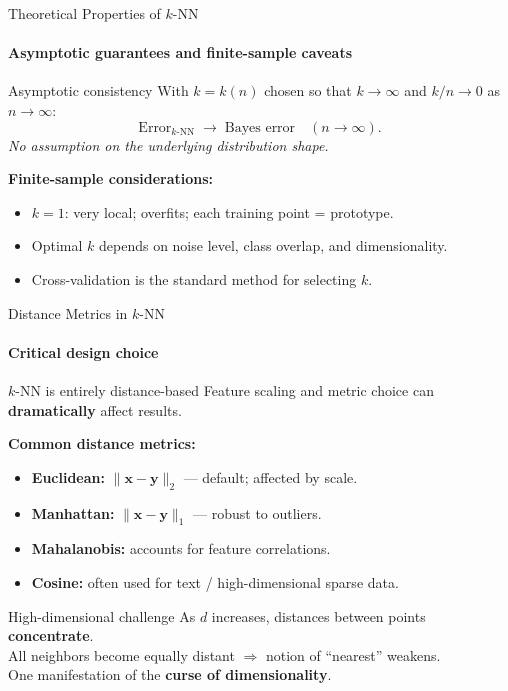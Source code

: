 \begin{frame}{Theoretical Properties of $k$-NN}
  \framesubtitle{Asymptotic guarantees and finite-sample caveats}
  \begin{block}{Asymptotic consistency}
    With $k=k(n)$ chosen so that $k\to\infty$ and $k/n\to 0$ as $n\to\infty$:\\
    \[
      \text{Error}_{k\text{-NN}} \;\longrightarrow\; \text{Bayes error}\quad(n\to\infty).
    \]
    \emph{No assumption on the underlying distribution shape.}
  \end{block}
  \bigskip
  \textbf{Finite-sample considerations:}
  \begin{itemize}
    \item $k=1$: very local; overfits; each training point = prototype.
    \item Optimal $k$ depends on noise level, class overlap, and dimensionality.
    \item Cross-validation is the standard method for selecting $k$.
  \end{itemize}
\end{frame}

\begin{frame}{Distance Metrics in $k$-NN}
  \framesubtitle{Critical design choice}
  \begin{alertblock}{$k$-NN is entirely distance-based}
    Feature scaling and metric choice can \textbf{dramatically} affect results.
  \end{alertblock}
  \medskip
  \textbf{Common distance metrics:}
  \begin{itemize}
    \item \textbf{Euclidean:} $\|\mathbf{x}-\mathbf{y}\|_2$ — default; affected by scale.
    \item \textbf{Manhattan:} $\|\mathbf{x}-\mathbf{y}\|_1$ — robust to outliers.
    \item \textbf{Mahalanobis:} accounts for feature correlations.
    \item \textbf{Cosine:} often used for text / high-dimensional sparse data.
  \end{itemize}
  \medskip
  \begin{block}{High-dimensional challenge}
    As $d$ increases, distances between points \textbf{concentrate}.\\
    All neighbors become equally distant $\Rightarrow$ notion of ``nearest'' weakens.\\
    One manifestation of the \textbf{curse of dimensionality}.
  \end{block}
\end{frame}

